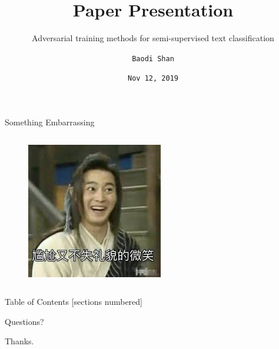 \documentclass[10pt,aspectratio=169]{beamer}
\title{Paper Presentation}
\subtitle{Adversarial training methods for semi-supervised text classification}
\date{\texttt{Nov 12, 2019}}
\author{\texttt{Baodi Shan}}
\begin{document}






\maketitle

\begin{frame}[fragile]{Something Embarrassing}
	\begin{columns}[onlytextwidth]
		
		\begin{figure}
			\includegraphics[width=1.2\linewidth]{gg.jpg}
		\end{figure}
		
	\end{columns}
\end{frame}




\begin{frame}{Table of Contents}
	[sections numbered]
	\tableofcontents[hideallsubsections]
\end{frame}

%





\begin{frame}[standout]
  Questions?
\end{frame}

\begin{frame}[standout]
  Thanks.
\end{frame}
\end{document}
